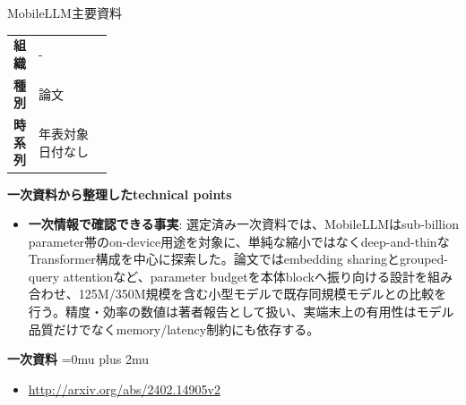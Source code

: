 \Needspace{0.38\textheight}
\begin{technicalnote}{MobileLLM}{主要資料}
\begingroup
\begin{tabularx}{\linewidth}{@{}>{\bfseries}p{0.22\linewidth}X@{}}
組織 & - \\
種別 & 論文 \\
時系列 & 年表対象日付なし \\
\end{tabularx}
\smallskip
\begin{minipage}{\linewidth}
{\bfseries 一次資料から整理したtechnical points}
\begin{itemize}[leftmargin=1.5em,itemsep=0.35em]
\item \textbf{一次情報で確認できる事実}: 選定済み一次資料では、MobileLLMはsub-billion parameter帯のon-device用途を対象に、単純な縮小ではなくdeep-and-thinなTransformer構成を中心に探索した。論文ではembedding sharingとgrouped-query attentionなど、parameter budgetを本体blockへ振り向ける設計を組み合わせ、125M/350M規模を含む小型モデルで既存同規模モデルとの比較を行う。精度・効率の数値は著者報告として扱い、実端末上の有用性はモデル品質だけでなくmemory/latency制約にも依存する。
\end{itemize}
\begin{minipage}{\linewidth}
\begin{samepage}
{\bfseries 一次資料}
\begingroup\sloppy
\Urlmuskip=0mu plus 2mu\relax
\begin{itemize}[leftmargin=1.5em,itemsep=0.25em]
\item {\scriptsize\url{http://arxiv.org/abs/2402.14905v2}}
\end{itemize}
\endgroup
\end{samepage}
\end{minipage}
\end{minipage}
\endgroup
\end{technicalnote}
\medskip

